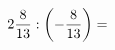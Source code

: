 \documentclass[preview]{standalone}
\begin{document}
\begin{align*}
2 { 8 \over 13 }  :  \left( - { 8 \over 13 } \right)  =
\end{align*}
\end{document}
